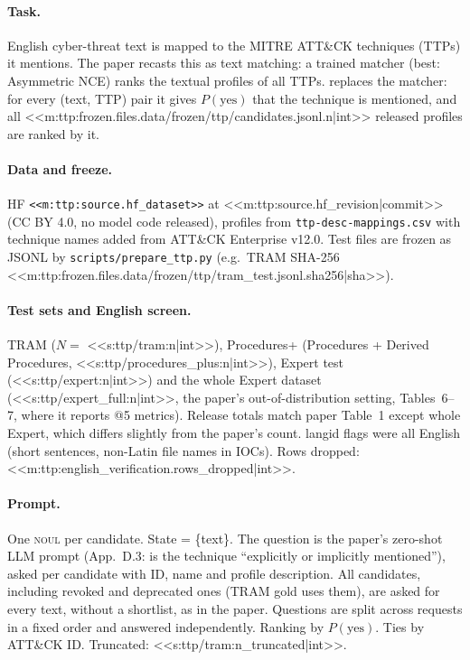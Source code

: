 \paragraph{Task.} English cyber-threat text is mapped to the MITRE ATT\&CK techniques (TTPs) it mentions. The paper
recasts this as text matching: a trained matcher (best: Asymmetric NCE) ranks the textual profiles of all TTPs.
\jev{} replaces the matcher: for every (text, TTP) pair it gives $P(\text{yes})$ that the technique is mentioned, and
all <<m:ttp:frozen.files.data/frozen/ttp/candidates.jsonl.n|int>> released profiles are ranked by it.

\paragraph{Data and freeze.} HF \texttt{<<m:ttp:source.hf_dataset>>} at <<m:ttp:source.hf_revision|commit>> (CC BY
4.0, no model code released), profiles from \texttt{ttp-desc-mappings.csv} with technique names added from ATT\&CK
Enterprise v12.0. Test files are frozen as JSONL by \texttt{scripts/prepare\_ttp.py} (e.g.\ TRAM SHA-256
<<m:ttp:frozen.files.data/frozen/ttp/tram_test.jsonl.sha256|sha>>).

\paragraph{Test sets and English screen.} TRAM ($N=$ <<s:ttp/tram:n|int>>), Procedures+ (Procedures + Derived
Procedures, <<s:ttp/procedures_plus:n|int>>), Expert test (<<s:ttp/expert:n|int>>) and the whole Expert dataset
(<<s:ttp/expert_full:n|int>>, the paper's out-of-distribution setting, Tables~6--7, where it reports @5 metrics).
Release totals match paper Table~1 except whole Expert, which differs slightly from the paper's count.
langid flags were all English (short sentences, non-Latin file names in IOCs). Rows dropped:
<<m:ttp:english_verification.rows_dropped|int>>.

\paragraph{Prompt.} One \textsc{noul} per candidate. State = \{text\}. The question is the paper's zero-shot LLM
prompt (App.~D.3: is the technique ``explicitly or implicitly mentioned''), asked per candidate with ID, name and
profile description. All candidates, including revoked and deprecated ones (TRAM gold uses them), are asked for every
text, without a shortlist, as in the paper. Questions are split across requests in a fixed order and answered
independently. Ranking by $P(\text{yes})$. Ties by ATT\&CK ID. Truncated: <<s:ttp/tram:n_truncated|int>>.

